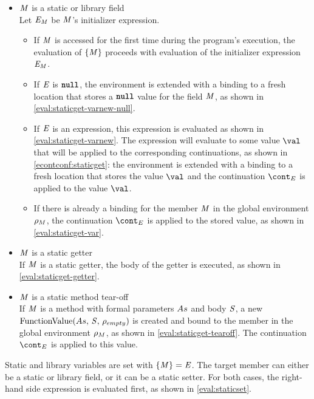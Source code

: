 \documentclass[a4paper,oneside,fleqn]{article}
\newcommand{\synt}[1]{\ensuremath{\text{\textbf{\texttt{#1}}}}}
\DeclareMathOperator{\nnull}{\synt{null}}
\begin{document}
\begin{itemize}
    \item $\mathit{M}$ is a static or library field\\
        Let $\mathit{E}_{\mathit{M}}$ be $\mathit{M}$'s initializer expression.
        \begin{itemize}
            \item If $\mathit{M}$ is accessed for the first time during the program's execution, the evaluation of $\{\mathit{M}\}$ proceeds with evaluation of the initializer expression $\mathit{E}_{\mathit{M}}$.
            \item If $\mathit{E}$ is $\nnull$, the environment is extended with a binding to a fresh location that stores a $\nnull$ value for the field $\mathit{M}$, as shown in \eqref{eval:staticget-varnew-null}.
            \item If $\mathit{E}$ is an expression, this expression is evaluated as shown in \eqref{eval:staticget-varnew}.
                The expression will evaluate to some value $\val$ that will be applied to the corresponding continuations, as shown in \eqref{econtconf:staticget}: the environment is extended with a binding to a fresh location that stores the value $\val$ and the continuation $\econt$ is applied to the value $\val$.
            \item If there is already a binding for the member $\mathit{M}$ in the global environment $\rho_{M}$, the continuation $\econt$ is applied to the stored value, as shown in \eqref{eval:staticget-var}.
        \end{itemize}

    \item $\mathit{M}$ is a static getter\\
        If $\mathit{M}$ is a static getter, the body of the getter is executed, as shown in \eqref{eval:staticget-getter}.

    \item $\mathit{M}$ is a static method tear-off\\
        If $\mathit{M}$ is a method with formal parameters $As$ and body $\mathit{S}$, a new $\mathrm{FunctionValue}({As},\,{\mathit{S}},\,{\rho_{empty}})$ is created and bound to the member in the global environment $\rho_{M}$, as shown in \eqref{eval:staticget-tearoff}.
        The continuation $\econt$ is applied to this value.

\end{itemize}

Static and library variables are set with $\{\mathit{M}\}=\mathit{E}$.
The target member can either be a static or library field, or it can be a static setter. For both cases, the right-hand side expression is evaluated first, as shown in \eqref{eval:staticset}.
\end{document}
